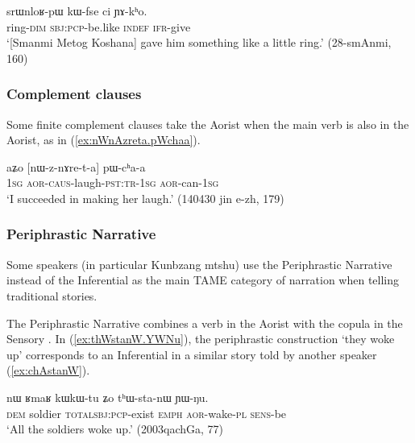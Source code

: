 \begin{exe}
\ex \label{ex:kWfse.ci.YAkho}
\gll srɯnloʁ-pɯ kɯ-fse ci ɲɤ-kʰo. \\
 ring-\textsc{dim} \textsc{sbj}:\textsc{pcp}-be.like \textsc{indef} \textsc{ifr}-give \\
 \glt `[Smanmi Metog Koshana] gave him something like a little ring.' (28-smAnmi, 160)
\end{exe}

\subsubsection{Complement clauses }   \label{sec:aor.complement} 
Some finite complement clauses take the Aorist when the main verb is also in the Aorist, as in (\ref{ex:nWnAzreta.pWchaa}). 

 \begin{exe}
\ex \label{ex:nWnAzreta.pWchaa}
\gll aʑo [nɯ-z-nɤre-t-a] pɯ-cʰa-a \\
\textsc{1sg} \textsc{aor}-\textsc{caus}-laugh-\textsc{pst}:\textsc{tr}-\textsc{1sg} \textsc{aor}-can-\textsc{1sg} \\
\glt `I succeeded in making her laugh.' (140430 jin e-zh, 179)
\end{exe}

\subsubsection{Periphrastic Narrative }   \label{sec:aor.narrative}
Some speakers (in particular Kunbzang mtshu) use the Periphrastic Narrative instead of the Inferential as the main TAME category of narration when telling traditional stories.

The Periphrastic Narrative combines a verb in the Aorist with the copula in the Sensory . In (\ref{ex:thWstanW.YWNu}), the periphrastic construction  `they woke up' corresponds to an Inferential  in a similar story told by another speaker (\ref{ex:chAstanW}).

\begin{exe}
\ex \label{ex:thWstanW.YWNu}
\gll  nɯ ʁmaʁ kɯ\redp{}kɯ-tu ʑo tʰɯ-sta-nɯ ɲɯ-ŋu. \\
\textsc{dem} soldier \textsc{total}\redp{}\textsc{sbj}:\textsc{pcp}-exist \textsc{emph} \textsc{aor}-wake-\textsc{pl} \textsc{sens}-be \\
\glt `All the soldiers woke up.' (2003qachGa, 77)
\end{exe}

